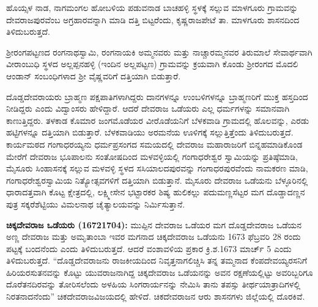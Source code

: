 ಹೊಯ್ಸಳ ನಾಡ, ನಾಗಮಂಗಲ ಹೋಬಳಿಯ ಪಡುವನಾಡ ಬಾಚಹಳ್ಳಿ ಸ್ಥಳಕ್ಕೆ ಸಲ್ಲುವ ಮಾಳಗೂರು ಗ್ರಾಮವನ್ನು ದೇವರಾಜಪುರವೆಂಬ ಅಗ್ರಹಾರವನ್ನಾಗಿ ಮಾಡಿ ದತ್ತಿ ಬಿಟ್ಟರೆಂದು, ಕೃಷ್ಣರಾಜಪೇಟೆ ತಾ. ಮಾಳಗೂರು ಶಾಸನದಿಂದ ತಿಳಿದುಬರುತ್ತದೆ.

ಶ‍್ರೀರಂಗಪಟ್ಟಣದ ರಂಗನಾಥಸ್ವಾಮಿ, ರಂಗನಾಯಕಿ ಅಮ್ಮನವರು ಮತ್ತು ನಾಚ್ಚಾರಮ್ಮನವರ ತಿರುಮಾಲೆ ಸೇವಾರ್ಥವಾಗಿ ವೀರಾಂಬುಧಿ ಸ್ಥಳದ ಅಲ್ಲಪ್ಪನಹಳ್ಳಿ (ಇಂದಿನ ಅಲ್ಲಪಟ್ಟಣ) ಗ್ರಾಮವನ್ನು ಕ್ರಯವಾಗಿ ಕೊಂಡು ಶ‍್ರೀರಂಗದ ಮೊದಲಿ ಆಂಡಾನ್​ ಸಂಬಂಧಿಗಳಾದ ಶ‍್ರೀ ವೈಷ್ಣವರಿಗೆ ದತ್ತಿಯಾಗಿ ಬಿಡುತ್ತಾರೆ.

ದೊಡ್ಡದೇವರಾಯರು ಬ್ರಾಹ್ಮಣ ಪಕ್ಷಪಾತಿಗಳಾಗಿದ್ದರು ದಾನಗಳನ್ನೂ ಉಂಬಳಿಗಳನ್ನೂ ಬ್ರಾಹ್ಮಣರಿಗೆ ಮುಕ್ತ ಹಸ್ತದಿಂದ ನೀಡಿದ್ದರು ಎಂದು ವಿದ್ವಾಂಸರು ಹೇಳಿದ್ದಾರೆ. ಆದರೆ ದೇವರಾಜ ಒಡೆಯರು ಎಲ್ಲ ಧರ್ಮಗಳನ್ನು ಸಮಾನವಾಗಿ ಕಾಣುತ್ತಿದ್ದರು. ತಳಕಾಡ ಕೊಮಾರ ಜಂಗಮೊಡೆಯರ ವೀರೊಡೆಯನಿಗೆ ಬೆಳಕವಾಡಿ ಗ್ರಾಮದಲ್ಲಿ ಹೊಲವನ್ನು, ಎರಡು ಹಟ್ಟಿಗಳನ್ನೂ ದತ್ತಿಯಾಗಿ ಬಿಡುತ್ತಾರೆ. ಬೆಳಕವಾಡಿಯು ಅರಮನೆಯ ಊಳಿಗಕ್ಕೆ ಸಲ್ಲುತ್ತಿತ್ತೆಂದು ತಿಳಿದುಬರುತ್ತದೆ. ಕಾರ್ಯಮಠದ ಗಂಗಾಧರಯ್ಯನು ಧರ್ಮಪ್ರಸಂಗದ ಸಮಯದಲ್ಲಿ ದೇವರಾಜ ಮಹಾರಾಜರಿಗೆ ಬಿನ್ನಹಮಾಡಿಕೊಂಡ ಮೇರೆಗೆ ದೇವರಾಜ ಭೂಪಾಲನು ಸಂತೋಷದಿಂದ ಮಳವಳ್ಳಿಯಲ್ಲಿ ಗಂಗಾಧರೇಶ್ವರ ಸ್ವಾಮಿಯನ್ನು ಪ್ರತಿಷ್ಠೆಮಾಡಿ, ಮೈಸೂರು ಸಿಂಹಾಸನಕ್ಕೆ ಸಲ್ಲುವ ಮಳವಳ್ಳಿ ಸ್ಥಳದ ಸಸಿಯಾಲದಪುರವನ್ನು ಗಂಗಾಧರಪುರವೆಂದು ನಾಮಕರಣ ಮಾಡಿ, ಗಂಗಾಧರೇಶ್ವರ\-ಸ್ವಾಮಿಯ ನಿತ್ಯೋತ್ಸವಗಳಿಗೆ ದತ್ತಿಯಾಗಿ ಬಿಡುತ್ತಾನೆ. ಮೈಸೂರು ದೇವರಾಜ ಒಡೆಯನು ಬೆಳ್ಳೂರಿನಲ್ಲಿ ಧಾರಾದತ್ತವಾಗಿ ಕೊಟ್ಟ ಕ್ಷೇತ್ರದಲ್ಲಿ, ಲಕ್ಷ್ಮೀಸೇನ ಭಟ್ಟಾರಕರ ಶಿಷ್ಯ ಹುಲಿಕಲ್ಲು ಪದುಮಣ್ಣಸೆಟ್ಟರ ಮಗ ದೊಡ್ಡಾದಣ್ಣನ ಪುತ್ರ ಸಕ್ಕರೆಶೆಟ್ಟಿಯು ವಿಮಲನಾಥ ಚೈತ್ಯಾಲಯವನ್ನು ನಿರ್ಮಿಸುತ್ತಾನೆ.

\textbf{ಚಿಕ್ಕದೇವರಾಜ ಒಡೆಯರು (1672\general{\enginline{-}}1704):} ಮುಪ್ಪಿನ ದೇವರಾಜ ಒಡೆಯರ ಮಗ ದೊಡ್ಡದೇವರಾಜ ಒಡೆಯನ ಅಣ್ಣ ದೇವರಾಜ ಮತ್ತು ಅಮೃತಾಂಬಾ ಇವರ ಮಗನಾದ ಚಿಕ್ಕದೇವರಾಜ ಒಡೆಯನು 1673 ಫೆಬ್ರವರಿ 28 ರಂದು ಪಟ್ಟಕ್ಕೆ ಬಂದನೆಂದು ಎಂದು ತಿಳಿದುಬರುತ್ತದೆ. ಆದರೆ ವಂಶಾವಳಿಯ ಪ್ರಕಾರ ಕ್ರಿ.ಶ.1673 ಮಾರ್ಚ್ 5 ಎಂದು ತಿಳಿದುಬರುತ್ತದೆ. “ದೊಡ್ಡದೇವರಾಜನು ರಾಜಕೀಯದಿಂದ ನಿವೃತ್ತನಾಗಲಿಚ್ಚಿಸಿ ತನ್ನ ತಮ್ಮನಾದ ಕೆಂಪದೇವಯ್ಯರಸನಿಗೆ ಹಿರಿಯರಸುತನವನ್ನು ಕೊಟ್ಟು ಯುವರಾಜನಾಗಿದ್ದ ಚಿಕ್ಕದೇವರಾಜ ಒಡೆಯನನ್ನು ಅವನ ರಕ್ಷಣೆಯಲ್ಲಿಟ್ಟು ಅವರಿಬ್ಬರಿಗೂ ದೊರೆತನದಿರವನ್ನು ತೋರಿಸಲೆಂದು ಅಳಹಿಯ ಸಿಂಗರಾರ್ಯನನ್ನು ನೇಮಿಸಿ ತಾನು ತಪಸ್ಸು ತೀರ್ಥಯಾತ್ರಾದಿಗಳಲ್ಲಿ ನಿರತನಾದನೆಂದು” ಚಿಕದೇವರಾಜವಿಜಯದಲ್ಲಿ ಹೇಳಿದೆ. ಚಿಕದೇವರಾಜನ ಆರು ಶಾಸನಗಳು ಜಿಲ್ಲೆಯಲ್ಲಿ ದೊರಕಿವೆ.

